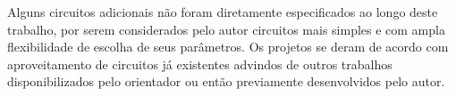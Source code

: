 Alguns circuitos adicionais n\~ao foram diretamente especificados ao longo deste trabalho, por serem considerados pelo autor circuitos mais simples e com ampla flexibilidade de escolha de seus par\^ametros. Os projetos se deram de acordo com aproveitamento de circuitos j\'a existentes advindos de outros trabalhos disponibilizados pelo orientador ou ent\~ao previamente desenvolvidos pelo autor.








